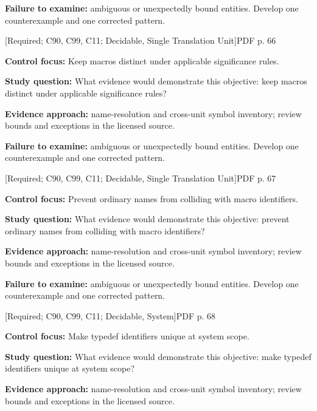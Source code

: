 \documentclass[10pt,letterpaper]{article}
\begin{document}
\textbf{Failure to examine:} ambiguous or unexpectedly bound entities. Develop one counterexample and one corrected pattern.\par
\smallskip
{}
 \textsf{\footnotesize [Required; C90, C99, C11; Decidable, Single Translation Unit]}\hfill{\footnotesize PDF p. 66}\par
\textbf{Control focus:} Keep macros distinct under applicable significance rules.\par
\textbf{Study question:} What evidence would demonstrate this objective: keep macros distinct under applicable significance rules?\par
\textbf{Evidence approach:} name-resolution and cross-unit symbol inventory; review bounds and exceptions in the licensed source.\par
\textbf{Failure to examine:} ambiguous or unexpectedly bound entities. Develop one counterexample and one corrected pattern.\par
\smallskip
{}
 \textsf{\footnotesize [Required; C90, C99, C11; Decidable, Single Translation Unit]}\hfill{\footnotesize PDF p. 67}\par
\textbf{Control focus:} Prevent ordinary names from colliding with macro identifiers.\par
\textbf{Study question:} What evidence would demonstrate this objective: prevent ordinary names from colliding with macro identifiers?\par
\textbf{Evidence approach:} name-resolution and cross-unit symbol inventory; review bounds and exceptions in the licensed source.\par
\textbf{Failure to examine:} ambiguous or unexpectedly bound entities. Develop one counterexample and one corrected pattern.\par
\smallskip
{}
 \textsf{\footnotesize [Required; C90, C99, C11; Decidable, System]}\hfill{\footnotesize PDF p. 68}\par
\textbf{Control focus:} Make typedef identifiers unique at system scope.\par
\textbf{Study question:} What evidence would demonstrate this objective: make typedef identifiers unique at system scope?\par
\textbf{Evidence approach:} name-resolution and cross-unit symbol inventory; review bounds and exceptions in the licensed source.\par
\end{document}
